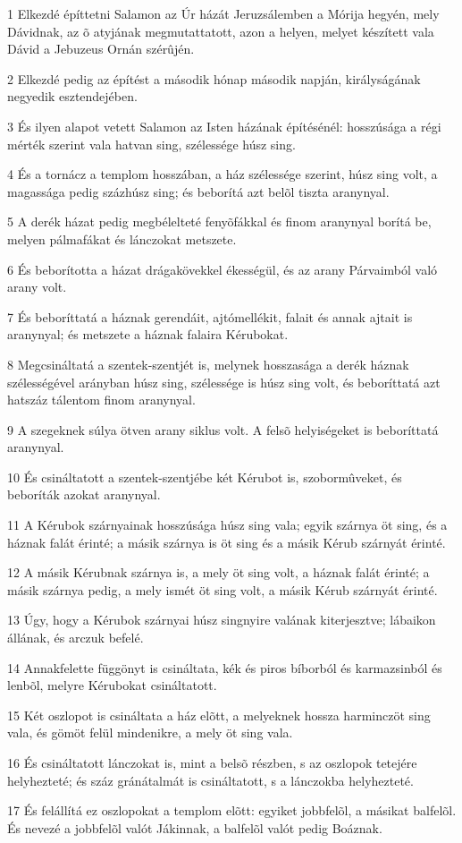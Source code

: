 \par 1 Elkezdé építtetni Salamon az Úr házát Jeruzsálemben a Mórija hegyén, mely Dávidnak, az  õ atyjának megmutattatott, azon a helyen, melyet készített vala Dávid a Jebuzeus Ornán szérûjén.
\par 2 Elkezdé pedig az építést a második hónap második napján, királyságának negyedik esztendejében.
\par 3 És ilyen alapot vetett Salamon az Isten házának építésénél: hosszúsága a régi mérték szerint vala hatvan sing, szélessége húsz sing.
\par 4 És a tornácz a templom hosszában, a ház szélessége szerint, húsz sing volt, a magassága pedig százhúsz sing; és beborítá azt belõl tiszta aranynyal.
\par 5 A derék házat pedig megbélelteté fenyõfákkal és finom aranynyal borítá be, melyen pálmafákat és lánczokat metszete.
\par 6 És beborította a házat drágakövekkel ékességül, és az arany Párvaimból való arany volt.
\par 7 És beboríttatá a háznak gerendáit, ajtómellékit, falait és annak ajtait is aranynyal; és metszete a háznak falaira Kérubokat.
\par 8 Megcsináltatá a szentek-szentjét is, melynek hosszasága a derék háznak szélességével arányban húsz sing, szélessége is húsz sing volt, és beboríttatá azt hatszáz tálentom finom aranynyal.
\par 9 A szegeknek súlya ötven arany siklus volt. A felsõ helyiségeket is beboríttatá aranynyal.
\par 10 És csináltatott a szentek-szentjébe két Kérubot is, szobormûveket, és beboríták azokat aranynyal.
\par 11 A Kérubok szárnyainak hosszúsága húsz sing vala; egyik szárnya öt sing, és a háznak falát érinté; a másik szárnya is öt sing és a másik Kérub szárnyát érinté.
\par 12 A másik Kérubnak szárnya is, a mely öt sing volt, a háznak falát érinté; a másik szárnya pedig, a mely ismét öt sing volt, a másik Kérub szárnyát érinté.
\par 13 Úgy, hogy a Kérubok szárnyai húsz singnyire valának kiterjesztve; lábaikon állának, és arczuk befelé.
\par 14 Annakfelette függönyt is csináltata, kék és piros bíborból és karmazsinból és lenbõl, melyre Kérubokat csináltatott.
\par 15 Két oszlopot is csináltata a ház elõtt, a melyeknek hossza harminczöt sing vala, és gömöt felül mindenikre, a mely öt sing vala.
\par 16 És csináltatott lánczokat is, mint a belsõ részben, s az oszlopok tetejére helyhezteté; és száz gránátalmát is csináltatott, s a lánczokba helyhezteté.
\par 17 És felállítá ez oszlopokat a templom elõtt: egyiket jobbfelõl, a másikat balfelõl. És nevezé a jobbfelõl valót Jákinnak, a balfelõl valót pedig Boáznak.

